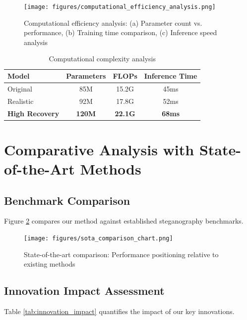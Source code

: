 \documentclass[12pt,a4paper]{report}
\begin{document}
\begin{figure}[H]
    \centering
    \texttt{[image: figures/computational\_efficiency\_analysis.png]}
    \caption{Computational efficiency analysis: (a) Parameter count vs. performance, (b) Training time comparison, (c) Inference speed analysis}
    \label{fig:efficiency_analysis}
\end{figure}

\begin{table}[H]
    \centering
    \caption{Computational complexity analysis}
    \label{tab:complexity}
    \begin{tabular}{@{}lccc@{}}
        \toprule
        Model & Parameters & FLOPs & Inference Time \\
        \midrule
        Original & 85M & 15.2G & 45ms \\
        Realistic & 92M & 17.8G & 52ms \\
        \textbf{High Recovery} & \textbf{120M} & \textbf{22.1G} & \textbf{68ms} \\
        \bottomrule
    \end{tabular}
\end{table}

\section{Comparative Analysis with State-of-the-Art Methods}

\subsection{Benchmark Comparison}

Figure \ref{fig:sota_comparison} compares our method against established steganography benchmarks.

\begin{figure}[H]
    \centering
    \texttt{[image: figures/sota\_comparison\_chart.png]}
    \caption{State-of-the-art comparison: Performance positioning relative to existing methods}
    \label{fig:sota_comparison}
\end{figure}

\subsection{Innovation Impact Assessment}

Table \ref{tab:innovation_impact} quantifies the impact of our key innovations.
\end{document}

